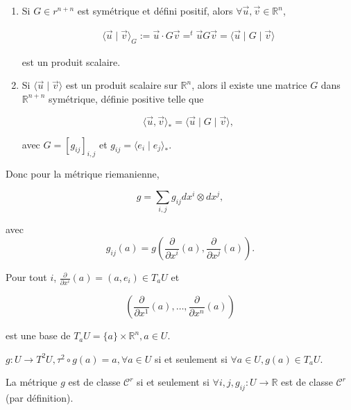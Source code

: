 \documentclass[french]{article}
\theoremstyle{definition}
\theoremstyle{remark}
\begin{document}
\begin{enumerate}
  \item Si \(G \in r ^{n+n}\) est symétrique et défini positif, alors \(\forall \overrightarrow{u}, \overrightarrow{v} \in \mathbb{R}^n\),

  \begin{gather*}
    \langle \overrightarrow{u} \mid \overrightarrow{v} \rangle _{G} := \overrightarrow{u} \cdot G \overrightarrow{v} = ^{t} \overrightarrow{u} G \overrightarrow{v} = \langle \overrightarrow{u} \mid G \mid \overrightarrow{v} \rangle
  \end{gather*}

  est un produit scalaire.

  \item Si \(\langle \overrightarrow{u} \mid \overrightarrow{v} \rangle \) est un produit scalaire sur \(\mathbb{R}^n\), alors il existe une matrice \(G\) dans \(\mathbb{R} ^{n+n}\) symétrique, définie positive telle que

  \[\langle \overrightarrow{u},\overrightarrow{v} \rangle _{*} = \langle \overrightarrow{u} \mid G \mid \overrightarrow{v} \rangle,  \]

  avec \(G = [g _{ij}] _{i,j}\) et \(g _{ij} = \langle e _{i} \mid e _{j} \rangle _{*} \).
\end{enumerate}

Donc pour la métrique riemanienne,

\[g = \sum_{i,j} g _{ij} d x^{i} \otimes d x^{j}, \]

avec \[g _{ij}(a) = g \left(\frac{\partial  }{\partial x ^{i}}(a), \frac{\partial  }{\partial x ^{j}}(a)\right).\]

Pour tout \(i\), \(\frac{\partial  }{\partial x ^{i}}(a) = (a, e_i) \in T_a U\) et

\[\left(\frac{\partial  }{\partial x ^{1}}(a), \dots, \frac{\partial  }{\partial x ^{n}}(a)\right)\]

est une base de \(T_a U = \{ a \} \times \mathbb{R}^n, a \in U\).

\(g : U \longrightarrow T ^2 U, \tau ^2 \circ g (a) = a, \forall a \in U\) si et seulement si \(\forall a \in U, g(a) \in T_a U\).

La métrique \(g\) est de classe \(\mathcal{C}^r\) si et seulement si \(\forall i, j, g _{ij} : U \longrightarrow \mathbb{R}\) est de classe \(\mathcal{C}^r\) (par définition).
\end{document}
